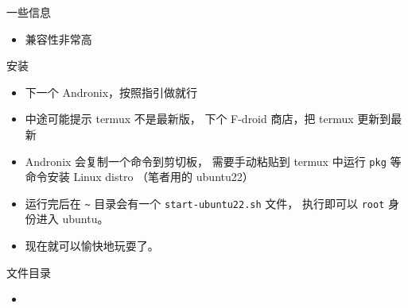 
一些信息
\begin{itemize}
\item 兼容性非常高
\end{itemize}


安装
\begin{itemize}
\item 下一个 Andronix，按照指引做就行
\item 中途可能提示 termux 不是最新版， 下个 F-droid 商店，把 termux 更新到最新
\item Andronix 会复制一个命令到剪切板， 需要手动粘贴到 termux 中运行 \verb`pkg` 等命令安装 Linux distro （笔者用的 ubuntu22）
\item 运行完后在 \verb`~` 目录会有一个 \verb`start-ubuntu22.sh` 文件， 执行即可以 \verb`root` 身份进入 ubuntu。
\item 现在就可以愉快地玩耍了。
\end{itemize}


文件目录
\begin{itemize}
\item 
\end{itemize}


